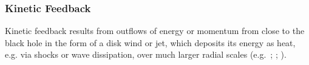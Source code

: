 \documentclass[usenatbib,fleqn]{mn2e}
\newcommand{\Mdot}{\dot{M}}
\newcommand{\eddr}{\dot{M}/\dot{M}_{\rm Edd}}
\newcommand{\eddrt}{\tilde{\dot{M}}/\dot{M}_{\rm Edd}}
\begin{document}



\subsubsection{Kinetic Feedback}

Kinetic feedback results from outflows of energy or momentum from
close to the black hole in the form of a disk wind or jet, which
deposits its energy as heat, e.g. via shocks or wave dissipation, over
much larger radial scales (e.g.~\citealt{McNamara&Nulsen07};
\citealt{Novak+11}; \citealt{Gaspari+12}).
\end{document}
